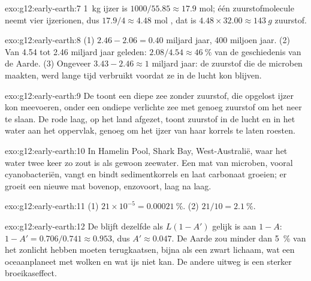 \begin{solution}{exo:g12:early-earth:7}
\qty{1}{kg} ijzer is $1000/55.85 \approx 17.9$ mol; één zuurstofmolecule
neemt vier ijzerionen, dus $17.9/4 \approx 4.48$ mol
, dat is $4.48 \times 32.00 \approx \qty{143}{g}$ zuurstof.
\end{solution}

\begin{solution}{exo:g12:early-earth:8}
(1) $2.46 - 2.06 = 0.40$ miljard jaar, 400 miljoen jaar. (2) Van 4.54
tot 2.46 miljard jaar geleden: $2.08/4.54 \approx \qty{46}{\percent}$ van de
geschiedenis van de Aarde. (3) Ongeveer $3.43 - 2.46 \approx 1$ miljard jaar: de zuurstof
die de microben maakten, werd lange tijd verbruikt voordat ze in de
lucht kon blijven.
\end{solution}

\begin{solution}{exo:g12:early-earth:9}
De  toont een diepe zee zonder zuurstof, die
opgelost ijzer kon meevoeren, onder een ondiepe verlichte zee met genoeg zuurstof om het
neer te slaan. De rode laag, op het land afgezet, toont zuurstof in de lucht en in het water
aan het oppervlak, genoeg om het ijzer van haar korrels te laten roesten.
\end{solution}

\begin{solution}{exo:g12:early-earth:10}
In Hamelin Pool, Shark Bay, West-Australië, waar het water twee keer zo
zout is als gewoon zeewater. Een mat van microben, vooral cyanobacteriën, vangt en
bindt sedimentkorrels en laat carbonaat groeien; er groeit een nieuwe mat bovenop,
enzovoort, laag na laag.
\end{solution}

\begin{solution}{exo:g12:early-earth:11}
(1) $21 \times 10^{-5} = \qty{0.00021}{\percent}$. (2) $21/10 =
\qty{2.1}{\percent}$.
\end{solution}

\begin{solution}{exo:g12:early-earth:12}
De  blijft dezelfde als $L(1 - A')$ gelijk is aan $1 - A$:
$1 - A' = 0.706/0.741 \approx 0.953$, dus $A' \approx 0.047$. De Aarde zou
minder dan \qty{5}{\percent} van het zonlicht hebben moeten terugkaatsen, bijna als een
zwart lichaam, wat een oceaanplaneet met wolken en wat ijs niet kan. De
andere uitweg is een sterker broeikaseffect.
\end{solution}

